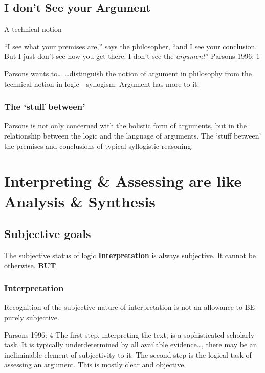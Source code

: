\documentclass{beamer}
\begin{document}
 
\subsection{I don't See your Argument}
\begin{frame}{A technical notion}
\begin{block}{}
``I see what your premises are,'' says the philosopher, ``and I see your conclusion.  But I just don't see how you get there.  I don't see the \textsl{argument}'' {Parsons 1996: 1}
\end{block}
\pause
\begin{block}{Parsons wants to\dots}
\ldots distinguish the notion of argument in philosophy from the technical notion in logic---syllogism. Argument has more \color{blue}{stuff} to it.  
\end{block} 
\end{frame}

\begin{frame}\frametitle{The `stuff between'}
Parsons is not only concerned with the holistic form of arguments, but in the relationship between the logic and the language of arguments. The `stuff between' the premises and conclusions of typical syllogistic reasoning.
\end{frame}


\section{Interpreting \& Assessing are like Analysis \& Synthesis}
\subsection{Subjective goals}
\begin{frame}{The subjective status of logic}
\textbf{Interpretation} is always subjective. It cannot be otherwise. 
{\bf BUT}
\end{frame}

\begin{frame}\frametitle{Interpretation}
Recognition of the subjective nature of interpretation is not an allowance to BE purely subjective. \pause
\begin{block}{Parsons 1996: 4}
The first step, interpreting the text, is a sophisticated scholarly task.  It is typically underdetermined by all available evidence\dots, there may be an ineliminable element of subjectivity to it.  The second step is the logical task of assessing an argument.  This is mostly clear and objective.  
\end{block}  
\end{frame}
\end{document}

